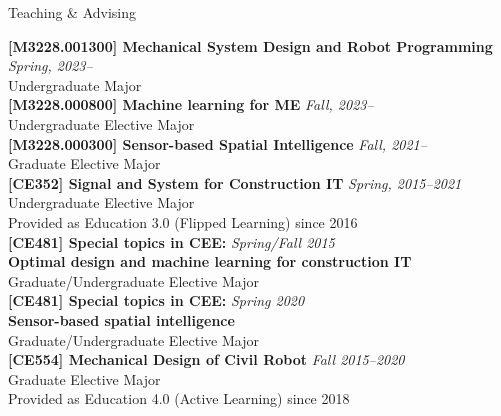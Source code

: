 \begin{rSection}{Teaching \& Advising}

{\bf[M3228.001300] Mechanical System Design and Robot Programming} \hfill {\em Spring, 2023--} \\
Undergraduate Major \\

{\bf[M3228.000800] Machine learning for ME} \hfill {\em Fall, 2023--} \\
Undergraduate Elective Major \\

{\bf[M3228.000300] Sensor-based Spatial Intelligence} \hfill {\em Fall, 2021--} \\
Graduate Elective Major \\

{\bf[CE352] Signal and System for Construction IT} \hfill {\em Spring, 2015--2021} \\
Undergraduate Elective Major \\
Provided as Education 3.0 (Flipped Learning) since 2016\\

{\bf[CE481] Special topics in CEE:} \hfill {\em Spring/Fall 2015} \\
{\bf Optimal design and machine learning for construction IT}\\
Graduate/Undergraduate Elective Major \\

{\bf[CE481] Special topics in CEE:} \hfill {\em Spring 2020} \\
{\bf Sensor-based spatial intelligence}\\
Graduate/Undergraduate Elective Major \\

{\bf[CE554] Mechanical Design of Civil Robot } \hfill {\em Fall 2015--2020} \\
Graduate Elective Major \\
Provided as Education 4.0 (Active Learning) since 2018\\


\end{rSection}
